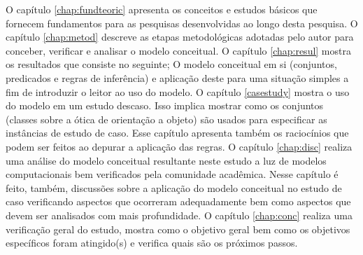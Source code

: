O capítulo \ref{chap:fundteoric} apresenta os conceitos e estudos básicos que fornecem fundamentos para as pesquisas desenvolvidas ao longo desta pesquisa. O capítulo \ref{chap:metod} descreve as etapas metodológicas adotadas pelo autor para conceber, verificar e analisar o modelo conceitual. O capítulo \ref{chap:resul} mostra os resultados que consiste no seguinte; O modelo conceitual em si (conjuntos, predicados e regras de inferência) e aplicação deste para uma situação simples a fim de introduzir o leitor ao uso do modelo. O capítulo \ref{casestudy} mostra o uso do modelo em um estudo descaso. Isso implica mostrar como os conjuntos (classes sobre a ótica de orientação a objeto) são usados para especificar as instâncias de estudo de caso. Esse capítulo apresenta também os raciocínios que podem ser feitos ao depurar a aplicação das regras. O capítulo \ref{chap:disc} realiza uma análise do modelo conceitual resultante neste estudo a luz de modelos computacionais bem verificados pela comunidade acadêmica. Nesse capítulo é feito, também, discussões sobre a aplicação do modelo conceitual no estudo de caso verificando aspectos que ocorreram adequadamente bem como aspectos que devem ser analisados com mais profundidade. O capítulo \ref{chap:conc} realiza uma verificação geral do estudo, mostra como o objetivo geral bem como os objetivos específicos foram atingido(s) e verifica quais são os próximos passos. 